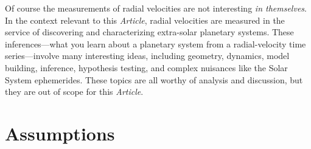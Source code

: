 \documentclass[modern]{aastex631}
\newcommand{\documentname}{\textsl{Article}}
\begin{document}
Of course the measurements of radial velocities are not interesting \emph{in themselves}.
In the context relevant to this \documentname, radial velocities are measured in the service of discovering and characterizing extra-solar planetary systems.
These inferences---what you learn about a planetary system from a radial-velocity time series---involve many interesting ideas, including geometry, dynamics, model building, inference, hypothesis testing, and complex nuisances like the Solar System ephemerides.
These topics are all worthy of analysis and discussion, but they are out of scope for this \documentname.

\section{Assumptions}\label{sec:assumptions}
\end{document}
